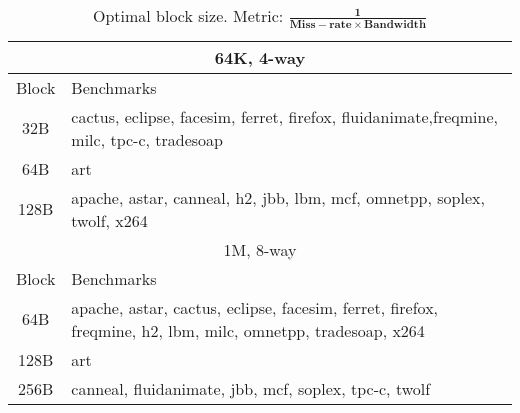 
\begin{table}[!h]
\caption[Optimal block size]{Optimal block size. Metric: $\mathbf{\frac{1}{Miss-rate \times Bandwidth}}$}
\label{table:bwmr_classify}
\begin{center}
{
\small
  \begin{tabular}{ |@{~}c@{~}| m{} |}
    \hline
    \multicolumn{2}{|c|}{64K, 4-way} \\
    \hline
    Block  & Benchmarks \\
    \hline
    32B   & cactus, eclipse, facesim, ferret, firefox, fluidanimate,freqmine, milc, tpc-c, tradesoap \\
    \hline
    64B   &  art \\
    \hline
    128B  & apache, astar, canneal, h2, jbb, lbm, mcf, omnetpp, soplex, twolf, x264 \\
    \hline
    \multicolumn{2}{|c|}{1M, 8-way} \\
    \hline
    Block & Benchmarks \\
    \hline
    64B  & apache, astar, cactus, eclipse, facesim, ferret, firefox, freqmine, h2, lbm, milc, omnetpp, tradesoap, x264\\
    \hline
    128B & art\\
    \hline
    256B  & canneal, fluidanimate, jbb, mcf, soplex, tpc-c, twolf\\
    \hline
  \end{tabular}
}
\end{center}
\end{table}

